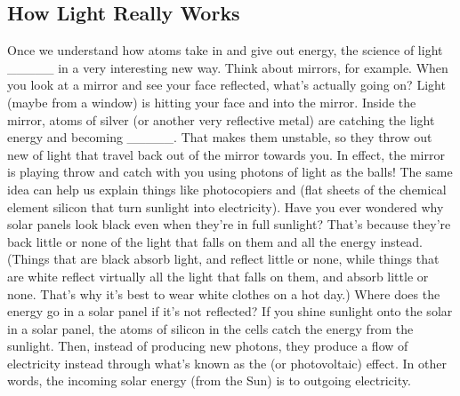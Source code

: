 \subsection*{How Light Really Works}
Once we understand how atoms take in and give out energy, the science of light \_\_\_\_\_
in a very interesting new way. Think about mirrors, for example. When you look at a mirror and see
your face reflected, what's actually going on? Light (maybe from a window) is hitting your face and
\underline{\hspace{2cm}} into the mirror. Inside the mirror, atoms of silver (or another very reflective
metal) are catching the \underline{\hspace{2cm}} light energy and becoming \_\_\_\_\_. That makes
them unstable, so they throw out new \underline{\hspace{2cm}} of light that travel back out of the mirror
towards you. In effect, the mirror is playing throw and catch with you using photons of light as the
balls!
The same idea can help us explain things like photocopiers and \underline{\hspace{2cm}} (flat sheets of the
chemical element silicon that turn sunlight into electricity). Have you ever wondered why solar
panels look black even when they're in full sunlight? That's because they're \underline{\hspace{2cm}} back
little or none of the light that falls on them and \underline{\hspace{2cm}} all the energy instead. (Things that
are black absorb light, and reflect little or none, while things that are white reflect virtually all the
light that falls on them, and absorb little or none. That's why it's best to wear white clothes on a hot
day.) Where does the energy go in a solar panel if it's not reflected? If you shine sunlight onto the
solar \underline{\hspace{2cm}} in a solar panel, the atoms of silicon in the cells catch the energy from the
sunlight. Then, instead of producing new photons, they produce a flow of electricity instead through
what's known as the \underline{\hspace{2cm}} (or photovoltaic) effect. In other words, the incoming solar
energy (from the Sun) is \underline{\hspace{2cm}} to outgoing electricity.

